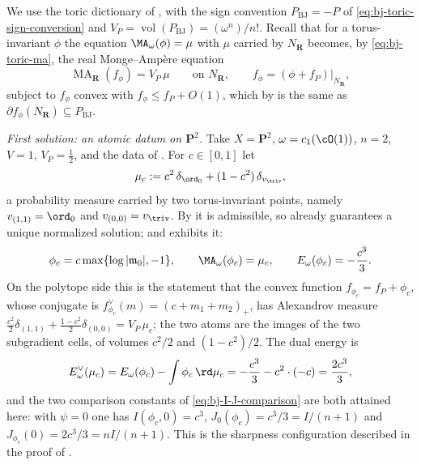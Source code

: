 \begin{example}
\label{ex:ch47-toric-cy}
We use the toric dictionary of
, with the sign
convention $P_{\mathrm{BJ}}=-P$ of
\eqref{eq:bj-toric-sign-conversion} and
$V_P=\operatorname{vol}(P_{\mathrm{BJ}})=(\omega^n)/n!$.  Recall that for
a torus-invariant $\phi$ the equation $\MA_\omega(\phi)=\mu$ with
$\mu$ carried by $N_{\mathbf R}$ becomes, by
\eqref{eq:bj-toric-ma}, the real Monge--Amp\`ere equation
\[
 \operatorname{MA}_{\mathbf R}(f_\phi)=V_P\,\mu
 \qquad\text{on }N_{\mathbf R},
 \qquad f_\phi=(\phi+f_P)|_{N_{\mathbf R}},
\]
subject to $f_\phi$ convex with $f_\phi\le f_P+O(1)$, which by
 is the same as
$\partial f_\phi(N_{\mathbf R})\subseteq P_{\mathrm{BJ}}$.

\emph{First solution: an atomic datum on $\mathbf P^2$.}  Take
$X=\mathbf P^2$, $\omega=c_1(\cO(1))$, $n=2$, $V=1$,
$V_P=\tfrac12$, and the data of .  For
$c\in[0,1]$ let
\[
 \mu_c:=c^2\,\delta_{\ord_0}+(1-c^2)\,\delta_{v_{\triv}},
\]
a probability measure carried by two torus-invariant points, namely
$v_{(1,1)}=\ord_0$ and $v_{(0,0)}=v_{\triv}$.  By
 it is admissible, so
 already guarantees a unique normalized
solution; and  exhibits it:
\[
 \phi_c=c\max\{\log|\mathfrak m_0|,-1\},
 \qquad
 \MA_\omega(\phi_c)=\mu_c,
 \qquad
 E_\omega(\phi_c)=-\frac{c^3}{3}.
\]
On the polytope side this is the statement that the convex function
$f_{\phi_c}=f_P+\phi_c$, whose conjugate is
$f_{\phi_c}^\vee(m)=(c+m_1+m_2)_+$, has Alexandrov measure
$\tfrac{c^2}{2}\delta_{(1,1)}+\tfrac{1-c^2}{2}\delta_{(0,0)}
=V_P\,\mu_c$; the two atoms are the images of the two subgradient cells,
of volumes $c^2/2$ and $(1-c^2)/2$.  The dual energy is
\[
 E^\vee_\omega(\mu_c)
 =E_\omega(\phi_c)-\int\phi_c\,\rd\mu_c
 =-\frac{c^3}{3}-c^2\cdot(-c)
 =\frac{2c^3}{3},
\]
and the two comparison constants of \eqref{eq:bj-I-J-comparison} are both
attained here: with $\psi=0$ one has
$I(\phi_c,0)=c^3$, $J_0(\phi_c)=c^3/3=I/(n+1)$ and
$J_{\phi_c}(0)=2c^3/3=nI/(n+1)$.  This is the sharpness configuration
described in the proof of .


\end{example}
